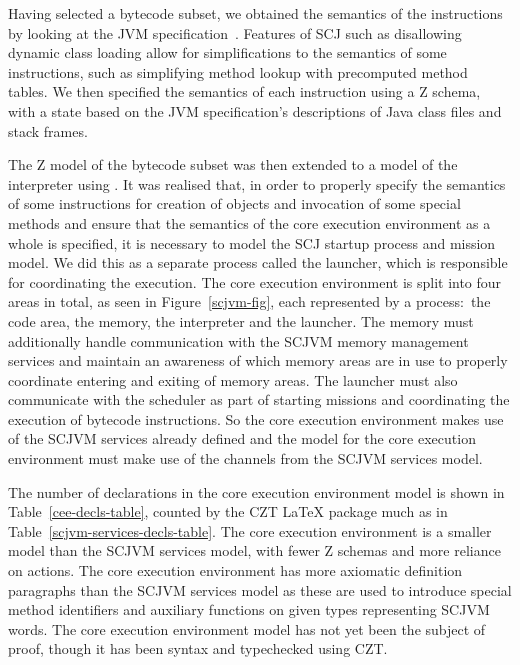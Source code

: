 \documentclass[a4paper,10pt]{report}
\begin{document}
Having selected a bytecode subset, we obtained the semantics of the
instructions by looking at the JVM specification~\cite{lindholm2014}.
Features of SCJ such as disallowing dynamic class loading allow for
simplifications to the semantics of some instructions, such as
simplifying method lookup with precomputed method tables.
We then specified the semantics of each instruction using a Z schema,
with a state based on the JVM specification's descriptions of Java
class files and stack frames.

The Z model of the bytecode subset was then extended to a model of the
interpreter using \Circus{}. 
It was realised that, in order to properly specify the semantics of
some instructions for creation of objects and invocation of some
special methods and ensure that the semantics of the core execution
environment as a whole is specified, it is necessary to model the SCJ
startup process and mission model.
We did this as a separate \Circus{} process called the launcher, which
is responsible for coordinating the execution.
The core execution environment is split into four areas in total, as
seen in Figure~\ref{scjvm-fig}, each represented by a \Circus{}
process:~the code area, the memory, the interpreter and the launcher.
The memory must additionally handle communication with the SCJVM
memory management services and maintain an awareness of which memory
areas are in use to properly coordinate entering and exiting of memory
areas.
The launcher must also communicate with the scheduler as part of
starting missions and coordinating the execution of bytecode
instructions.
So the core execution environment makes use of the SCJVM services
already defined and the \Circus{} model for the core execution
environment must make use of the channels from the SCJVM services
model.

The number of declarations in the core execution environment model is
shown in Table~\ref{cee-decls-table}, counted by the CZT \LaTeX{}
package much as in Table~\ref{scjvm-services-decls-table}.
The core execution environment is a smaller model than the SCJVM
services model, with fewer Z schemas and more reliance on \Circus{}
actions.
The core execution environment has more axiomatic definition
paragraphs than the SCJVM services model as these are used to
introduce special method identifiers and auxiliary functions on given
types representing SCJVM words.
The core execution environment model has not yet been the subject of
proof, though it has been syntax and typechecked using CZT.
\end{document}

